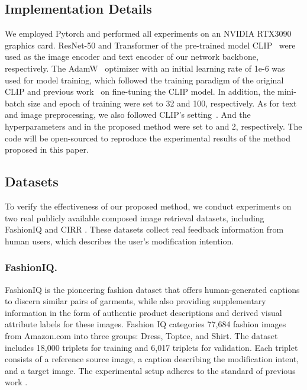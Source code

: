 \documentclass[letterpaper]{article} \usepackage{aaai24}  \usepackage{times}  \usepackage{helvet}  \usepackage{courier}  \usepackage[hyphens]{url}  \usepackage{graphicx} \urlstyle{rm} \def\UrlFont{\rm}  \usepackage{natbib}  \usepackage{caption} \frenchspacing  \setlength{\pdfpagewidth}{8.5in} \setlength{\pdfpageheight}{11in} \usepackage{amsmath,amsfonts}
\begin{document}
\subsection{Implementation Details}
We employed Pytorch and performed all experiments on an NVIDIA RTX3090 graphics card. ResNet-50 and Transformer of the pre-trained model CLIP~\cite{Radford2021CLIP} were used as the image encoder and text encoder of our network backbone, respectively. The AdamW~\cite{Kingma2015adam} optimizer with an initial learning rate of 1e-6 was used for model training, which followed the training paradigm of the original CLIP and previous work~\cite{CLIP4Cir} on fine-tuning the CLIP model. In addition, the mini-batch size and epoch of training were set to 32 and 100, respectively. As for text and image preprocessing, we also followed CLIP's setting~\cite{Radford2021CLIP}. And the hyperparameters  and  in the proposed method were set to  and 2, respectively. The code will be open-sourced to reproduce the experimental results of the method proposed in this paper.

\subsection{Datasets}
To verify the effectiveness of our proposed method, we conduct experiments on two real publicly available composed image retrieval datasets, including FashionIQ \cite{guo2019fashion} and CIRR \cite{liu2021image}. These datasets collect real feedback information from human users, which describes the user's modification intention.

\subsubsection{FashionIQ.}
FashionIQ \cite{guo2019fashion} is the pioneering fashion dataset that offers human-generated captions to discern similar pairs of garments, while also providing supplementary information in the form of authentic product descriptions and derived visual attribute labels for these images. Fashion IQ categories 77,684 fashion images from Amazon.com into three groups: Dress, Toptee, and Shirt. The dataset includes 18,000 triplets for training and 6,017 triplets for validation. Each triplet consists of a reference source image, a caption describing the modification intent, and a target image. The experimental setup adheres to the standard of previous work \cite{Chen_2020_CVPR, 2021CoSMo, CLIP4Cir, chen2022composed}.
\end{document}
